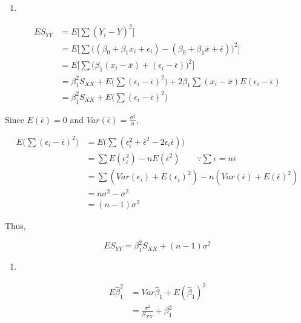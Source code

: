 \documentclass[]{book}
\theoremstyle{definition}
\theoremstyle{definition}
\theoremstyle{definition}
\theoremstyle{remark}
\begin{document}
\begin{enumerate}
\def\labelenumi{(\alph{enumi})}
\item
\end{enumerate}

\begin{equation*}
  \begin{split}
    ES_{YY} & = E\Big[ \sum (Y_i - \overline{Y})^2 \Big] \\
    & = E \Big[ \sum \Big( (\beta_0 + \beta_1 x_i + \epsilon_i) - (\beta_0 + \beta_1 \overline{x} + \overline{\epsilon}) \Big)^2 \Big] \\
    & = E \Big[ \sum \Big( \beta_1 (x_i - \overline{x}) + (\epsilon_i - \overline{\epsilon}) \Big)^2 \Big] \\
    & = \beta_1^2 S_{XX} + E\Big( \sum (\epsilon_i - \overline{\epsilon})^2 \Big) + 2\beta_1 \sum (x_i - \overline{x}) E(\epsilon_i - \overline{\epsilon}) \\
    & = \beta_1^2 S_{XX} + E\Big( \sum (\epsilon_i - \overline{\epsilon})^2 \Big)
  \end{split}
\end{equation*}

Since \(E(\bar\epsilon) = 0\) and \(Var(\bar\epsilon) = \frac{\sigma^2}{n}\),

\begin{equation*}
  \begin{split}
    E\Big( \sum (\epsilon_i - \overline{\epsilon})^2 \Big) & = E \Big( \sum (\epsilon_i^2 + \bar\epsilon^2 - 2\epsilon_i \bar\epsilon) \Big) \\
    & = \sum E(\epsilon_i^2) - n E(\bar\epsilon^2) \qquad \because \sum \epsilon = n \bar\epsilon \\
    & = \sum (Var(\epsilon_i) + E(\epsilon_i)^2) - n(Var(\bar\epsilon) + E(\bar\epsilon)^2) \\
    & = n\sigma^2 - \sigma^2 \\
    & = (n - 1)\sigma^2
  \end{split}
\end{equation*}

Thus,

\[ES_{YY} = \beta_1^2 S_{XX} + (n - 1)\sigma^2\]

\begin{enumerate}
\def\labelenumi{(\alph{enumi})}
\setcounter{enumi}{1}
\item
\end{enumerate}

\begin{equation*}
  \begin{split}
    E\hat\beta_1^2 & = Var\hat\beta_1 + E(\hat\beta_1)^2 \\
    & = \frac{\sigma^2}{S_{XX}} + \beta_1^2
  \end{split}
\end{equation*}
\end{document}

